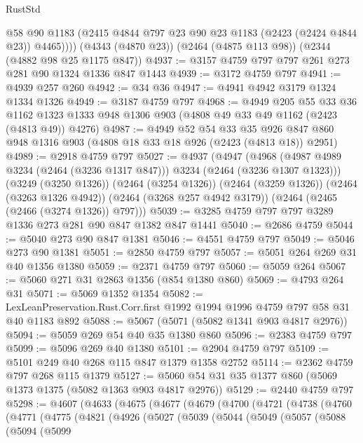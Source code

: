 \begin{lexlean}{RustStd}
\begin{coremodule}
          @58
          @90
          @1183
          (@2415 @4844 @797 @23 @90 @23 @1183 (@2423 (@2424 @4844 @23)) @4465))))
    (@4343 (@4870 @23))
    (@2464 (@4875 @113 @98))
    (@2344 (@4882 @98 @25 @1175 @847))
@4937 := @3157 @4759 @797 @797 @261 @273 @281 @90 @1324 @1336 @847 @1443
@4939 := @3172 @4759 @797
@4941 := @4939 @257 @260
@4942 := @34 @36
@4947 := @4941 @4942 @3179 @1324 @1334 @1326
@4949 := @3187 @4759 @797
@4968 := @4949
    @205
    @55
    @33
    @36
    @1162
    @1323
    @1333
    @948
    @1306
    @903
    (@4808 @49 @33 @49 @1162 (@2423 (@4813 @49)) @4276)
@4987 := @4949
    @52
    @54
    @33
    @35
    @926
    @847
    @860
    @948
    @1316
    @903
    (@4808 @18 @33 @18 @926 (@2423 (@4813 @18)) @2951)
@4989 := @2918 @4759 @797
@5027 := @4937
    (@4947
      (@4968 (@4987 @4989 @3234 (@2464 (@3236 @1317 @847))) @3234 (@2464 (@3236 @1307 @1323)))
      (@3249 (@3250 @1326))
      (@2464 (@3254 @1326))
      (@2464 (@3259 @1326))
      (@2464 (@3263 @1326 @4942))
      (@2464 (@3268 @257 @4942 @3179))
      (@2464 (@2465 (@2466 (@3274 @1326)) @797)))
@5039 := @3285 @4759 @797 @797 @3289 @1336 @273 @281 @90 @847 @1382 @847 @1441
@5040 := @2686 @4759
@5044 := @5040 @273 @90 @847 @1381
@5046 := @4551 @4759 @797
@5049 := @5046 @273 @90 @1381
@5051 := @2850 @4759 @797
@5057 := @5051 @264 @269 @31 @40 @1356 @1380
@5059 := @2371 @4759 @797
@5060 := @5059 @264
@5067 := @5060 @271 @31 @2863 @1356 (@854 @1380 @860)
@5069 := @4793 @264 @31
@5071 := @5069 @1352 @1354
@5082 := LexLeanPreservation.Rust.Corr.first @1992 @1994 @1996 @4759 @797 @58 @31 @40 @1183 @892
@5088 := @5067 (@5071 (@5082 @1341 @903 @4817 @2976))
@5094 := @5059 @269 @54 @40 @35 @1380 @860
@5096 := @2383 @4759 @797
@5099 := @5096 @269 @40 @1380
@5101 := @2904 @4759 @797
@5109 := @5101 @249 @40 @268 @115 @847 @1379 @1358 @2752
@5114 := @2362 @4759 @797 @268 @115 @1379
@5127 := @5060 @54 @31 @35 @1377 @860 (@5069 @1373 @1375 (@5082 @1363 @903 @4817 @2976))
@5129 := @2440 @4759 @797
@5298 := @4607
    (@4633
      (@4675
        (@4677
          (@4679
            (@4700
              (@4721
                (@4738
                  (@4760
                    (@4771
                      (@4775
                        (@4821
                          (@4926
                            (@5027
                              (@5039
                                (@5044
                                  (@5049
                                    (@5057
                                      (@5088
                                        (@5094
                                          (@5099

\end{coremodule}
\end{lexlean}
